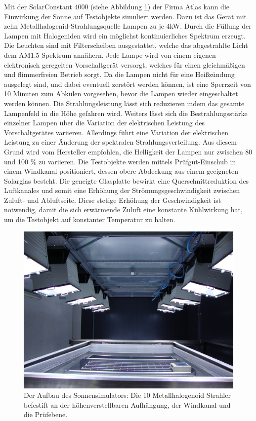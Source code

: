 \documentclass[a4paper,bibtotoc,oneside]{scrbook}
\begin{document}
Mit der SolarConstant 4000 (siehe Abbildung \ref{sunsim}) der Firma Atlas kann die Einwirkung der Sonne auf Testobjekte simuliert werden. Dazu ist das Gerät mit zehn Metallhalogenid-Strahlungsquelle Lampen zu je 4kW. Durch die Füllung der Lampen mit Halogeniden wird ein möglichst kontinuierliches Spektrum erzeugt. Die Leuchten sind mit Filterscheiben ausgestattet, welche das abgestrahlte Licht dem AM1.5 Spektrum annähern.
Jede Lampe wird von einem eigenen elektronisch geregelten Vorschaltgerät versorgt, welches für einen gleichmäßigen und flimmerfreien Betrieb sorgt.
Da die Lampen nicht für eine Heißzündung ausgelegt sind, und dabei eventuell zerstört werden können, ist eine Sperrzeit von 10 Minuten zum Abkülen vorgesehen, bevor die Lampen wieder eingeschaltet werden können.
Die Strahlungsleistung lässt sich reduzieren indem das gesamte Lampenfeld in die Höhe gefahren wird.
Weiters lässt sich die Bestrahlungsstärke einzelner Lampen über die Variation der elektrischen Leistung des Vorschaltgerätes variieren.
Allerdings führt eine Variation der elektrischen Leistung zu einer Änderung der spektralen Strahlungsverteilung. Aus diesem Grund wird vom Hersteller empfohlen, die Helligkeit der Lampen nur zwischen 80 und 100 \% zu variieren.
Die Testobjekte werden mittels Prüfgut-Einschub in einem Windkanal positioniert, dessen obere Abdeckung aus einem geeigneten Solarglas besteht. Die geneigte Glasplatte bewirkt eine Querschnittreduktion des Luftkanales und somit eine Erhöhung der Strömungsgeschwindigkeit zwischen Zuluft- und Abluftseite. Diese stetige Erhöhung der Geschwindigkeit ist notwendig, damit die sich erwärmende Zuluft eine konstante Kühlwirkung hat, um die Testobjekt auf konstanter Temperatur zu halten.


\begin{figure}[htbp]
\centering
\includegraphics[width=125mm]{img/sunsimulator.jpg}
\caption[Sonnensimulator]{Der Aufbau des Sonnensimulators: Die 10 Metallhalogenoid Strahler befestift an der höhenverstellbaren Aufhängung, der Windkanal und die Prüfebene.}\label{sunsim}
\end{figure}
\end{document}
